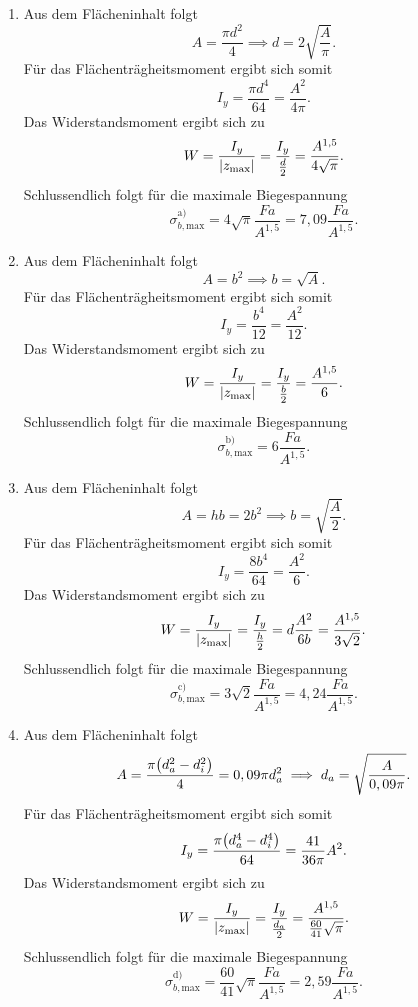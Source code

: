 \documentclass{exercise}
\begin{document}
    \begin{enumerate}
        \item Aus dem Flächeninhalt folgt
        \[
            A = \frac{\pi d^2}{4} \implies d = 2\sqrt{\frac{A}{\pi}}.
        \]
        Für das Flächenträgheitsmoment ergibt sich somit
        \[
            I_y = \frac{\pi d^4}{64} = \frac{A^2}{4\pi}.
        \]
        Das Widerstandsmoment ergibt sich zu
        \[
            W = \frac{I_y}{\absolute*{z_{\text{max}}}} = \frac{I_y}{\frac{d}{2}} = \frac{A^{1,5}}{4\sqrt{\pi}}.
        \]
        Schlussendlich folgt für die maximale Biegespannung
        \[
            \sigma_{b, \text{max}}^{\text{a)}} = 4\sqrt{\pi}\frac{Fa}{A^{1,5}} = 7,09\frac{Fa}{A^{1,5}}.
        \]
        \item Aus dem Flächeninhalt folgt
        \[
            A = b^2 \implies b = \sqrt{A}.
        \]
        Für das Flächenträgheitsmoment ergibt sich somit
        \[
            I_y = \frac{b^4}{12} = \frac{A^2}{12}.
        \]
        Das Widerstandsmoment ergibt sich zu
        \[
            W = \frac{I_y}{\absolute*{z_{\text{max}}}} = \frac{I_y}{\frac{b}{2}} = \frac{A^{1,5}}{6}.
        \]
        Schlussendlich folgt für die maximale Biegespannung
        \[
            \sigma_{b, \text{max}}^{\text{b)}} = 6\frac{Fa}{A^{1,5}}.
        \]
        \item Aus dem Flächeninhalt folgt
        \[
            A = hb = 2b^2 \implies b = \sqrt{\frac{A}{2}}.
        \]
        Für das Flächenträgheitsmoment ergibt sich somit
        \[
            I_y = \frac{8b^4}{64} = \frac{A^2}{6}.
        \]
        Das Widerstandsmoment ergibt sich zu
        \[
            W = \frac{I_y}{\absolute*{z_{\text{max}}}} = \frac{I_y}{\frac{h}{2}} = d\frac{A^2}{6b} = \frac{A^{1,5}}{3\sqrt{2}}.
        \]
        Schlussendlich folgt für die maximale Biegespannung
        \[
            \sigma_{b, \text{max}}^{\text{c)}} = 3\sqrt{2}\frac{Fa}{A^{1,5}} = 4,24\frac{Fa}{A^{1,5}}.
        \]
        \item Aus dem Flächeninhalt folgt
        \[
            A = \frac{\pi\parentheses*{d_a^2 - d_i^2}}{4} = 0,09\pi d_a^2 \implies d_a = \sqrt{\frac{A}{0,09\pi}}.
        \]
        Für das Flächenträgheitsmoment ergibt sich somit
        \[
            I_y = \frac{\pi\parentheses*{d_a^4 - d_i^4}}{64} = \frac{41}{36\pi}A^2.
        \]
        Das Widerstandsmoment ergibt sich zu
        \[
            W = \frac{I_y}{\absolute*{z_{\text{max}}}} = \frac{I_y}{\frac{d_a}{2}} = \frac{A^{1,5}}{\frac{60}{41}\sqrt{\pi}}.
        \]
        Schlussendlich folgt für die maximale Biegespannung
        \[
            \sigma_{b, \text{max}}^{\text{d)}} = \frac{60}{41}\sqrt{\pi}\frac{Fa}{A^{1,5}} = 2,59\frac{Fa}{A^{1,5}}.
        \]
    \end{enumerate}
    
\end{document}
